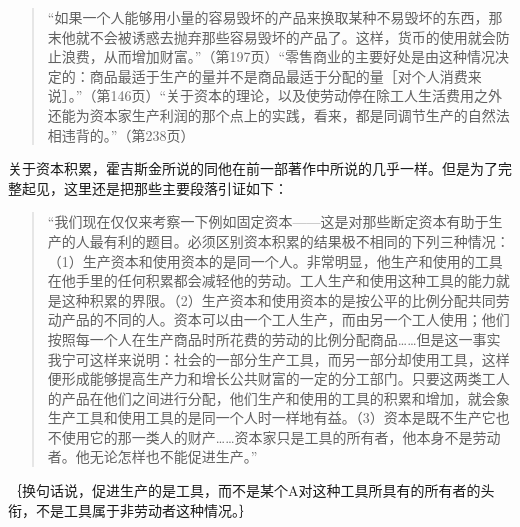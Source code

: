 \begin{quote}{“如果一个人能够用小量的容易毁坏的产品来换取某种不易毁坏的东西，那末他就不会被诱惑去抛弃那些容易毁坏的产品了。这样，货币的使用就会防止浪费，从而增加财富。”（第197页）“零售商业的主要好处是由这种情况决定的：商品最适于生产的量并不是商品最适于分配的量［对个人消费来说］。”（第146页）“关于资本的理论，以及使劳动停在除工人生活费用之外还能为资本家生产利润的那个点上的实践，看来，都是同调节生产的自然法相违背的。”（第238页）}\end{quote}

关于资本积累，霍吉斯金所说的同他在前一部著作中所说的几乎一样。但是为了完整起见，这里还是把那些主要段落引证如下：

\begin{quote}{“我们现在仅仅来考察一下例如固定资本——这是对那些断定资本有助于生产的人最有利的题目。必须区别资本积累的结果极不相同的下列三种情况：（1）生产资本和使用资本的是同一个人。非常明显，他生产和使用的工具在他手里的任何积累都会减轻他的劳动。工人生产和使用这种工具的能力就是这种积累的界限。（2）生产资本和使用资本的是按公平的比例分配共同劳动产品的不同的人。资本可以由一个工人生产，而由另一个工人使用；他们按照每一个人在生产商品时所花费的劳动的比例分配商品……但是这一事实我宁可这样来说明：社会的一部分生产工具，而另一部分却使用工具，这样便形成能够提高生产力和增长公共财富的一定的分工部门。只要这两类工人的产品在他们之间进行分配，他们生产和使用的工具的积累和增加，就会象生产工具和使用工具的是同一个人时一样地有益。（3）资本是既不生产它也不使用它的那一类人的财产……资本家只是工具的所有者，他本身不是劳动者。他无论怎样也不能促进生产。”}\end{quote}

｛换句话说，促进生产的是工具，而不是某个A对这种工具所具有的所有者的头衔，不是工具属于非劳动者这种情况。｝


